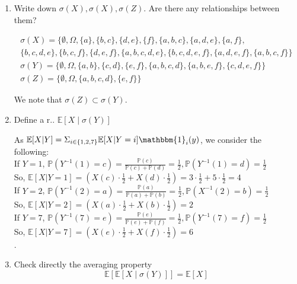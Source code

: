 \documentclass[12pt,twoside, letter]{exam}
\theoremstyle{definition}
\newcommand{\ee}{\mathbb{E}}
\newcommand{\pp}{\mathbb{P}}
\newcommand{\id}{\mathbbm{1}}
\begin{document}
\begin{enumerate}
  \item Write down $\sigma(X), \sigma(X), \sigma(Z)$. Are there any relationships between them?
    \begin{solution}
      \begin{multline*}
        \sigma(X) = \{\emptyset, \Omega, \{a\}, \{b,c\}, \{d,e\}, \{f\}, \{a,b,c\}, \{a,d,e\}, \{a,f\}, \\
            \{b,c,d,e\}, \{b,c,f\}, \{d,e,f\},
            \{a,b,c,d,e\}, \{b,c,d,e,f\}, \{a,d,e,f\}, \{a,b,c,f\}\} \\
        \sigma(Y) = \{\emptyset, \Omega, \{a,b\}, \{c,d\}, \{e,f\}, \{a,b,c,d\}, \{a,b,e,f\}, \{c,d,e,f\}\}\\
        \sigma(Z) = \{ \emptyset, \Omega, \{a,b,c,d\}, \{e,f\} \}
      \end{multline*}

    We note that $\sigma(Z) \subset \sigma(Y)$.
    \end{solution}
  \item Define a r.. $\ee[X \mid \sigma(Y)]$
    \begin{solution}
      As $\ee[X|Y] = \Sigma_{i \in \{1,2,7\}} \ee[X|Y = i]\id_{i}(y)$, we consider the following: \\
      If $Y = 1$, $\pp(Y^{-1}(1) = c) = \frac{\pp(c)}{\pp(c) + \pp(d)} = \frac{1}{2}, \pp(Y^{-1}(1) = d) = \frac{1}{2}$\\
      So, $\ee[X|Y = 1] = (X(c) \cdot \frac{1}{2} + X(d) \cdot \frac{1}{2}) = 3\cdot \frac{1}{2} + 5\cdot \frac{1}{2}
      = 4$ \\
      If $Y = 2$, $\pp(Y^{-1}(2) = a) = \frac{\pp(a)}{\pp(a) + \pp(b)} = \frac{1}{2}, \pp(X^{-1}(2) = b) = \frac{1}{2}$\\
      So, $\ee[X|Y = 2] = (X(a) \cdot \frac{1}{2} + X(b) \cdot \frac{1}{2}) = 2$ \\
      If $Y = 7$, $\pp(Y^{-1}(7) = e) = \frac{\pp(e)}{\pp(e) + \pp(f)} = \frac{1}{2}, \pp(Y^{-1}(7) = f) = \frac{1}{2}$ \\
      So, $\ee[X|Y = 7] = (X(e) \cdot \frac{1}{2} + X(f) \cdot \frac{1}{2}) = 6$ \\.
    \end{solution}
  \item Check directly the averaging property
    \begin{equation*}
      \ee[\ee[X \mid \sigma(Y)]] = \ee[X]
    \end{equation*}


\end{enumerate}
\end{document}
